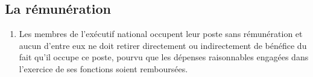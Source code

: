 \subsection{La rémunération}
\label{la-remuneration-2}

\begin{enumerate}
 \item
  Les membres de l'exécutif national occupent leur poste sans rémunération et aucun d'entre eux ne doit retirer directement ou indirectement de bénéfice du fait qu'il occupe ce poste, pourvu que les dépenses raisonnables engagées dans l'exercice de ses fonctions soient remboursées.
\end{enumerate}

